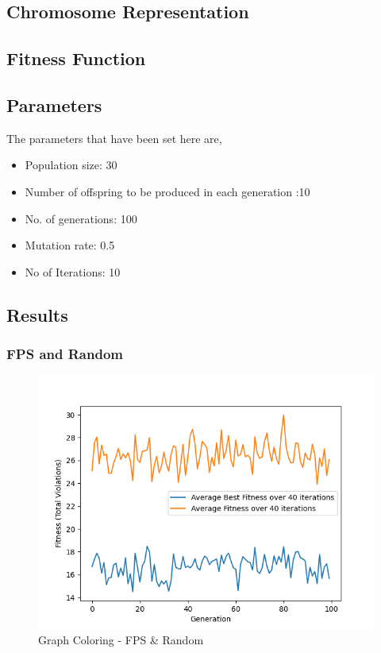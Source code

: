 \documentclass[11pt, letterpaper]{article}
\begin{document}
\subsection {Chromosome Representation}
\subsection {Fitness Function}
\subsection {Parameters}
The parameters that have been set here are,
\begin{itemize}
    \item Population size: 30
    \item Number of offspring to be produced in each generation :10
    \item No. of generations: 100
    \item Mutation rate: 0.5
    \item No of Iterations: 10
\end{itemize}
\subsection {Results} 
\subsubsection {FPS and Random}
\begin{figure}[H]
    \centering
    \includegraphics[scale = 0.6]{images/graphcoloring_fp_rd.png}
    \caption {Graph Coloring - FPS \& Random}
    \label {fig:gcFR}
\end{figure}
\end{document}
